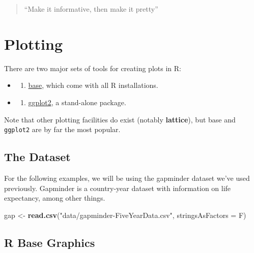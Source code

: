 \documentclass[]{book}
\newenvironment{Shaded}{\begin{snugshade}}{\end{snugshade}}
\newcommand{\KeywordTok}[1]{\textcolor[rgb]{0.13,0.29,0.53}{\textbf{#1}}}
\newcommand{\DataTypeTok}[1]{\textcolor[rgb]{0.13,0.29,0.53}{#1}}
\newcommand{\StringTok}[1]{\textcolor[rgb]{0.31,0.60,0.02}{#1}}
\newcommand{\NormalTok}[1]{#1}
\providecommand{\tightlist}{%
  \setlength{\itemsep}{0pt}\setlength{\parskip}{0pt}}
\begin{document}
\begin{quote}
``Make it informative, then make it pretty''
\end{quote}

\chapter{Plotting}\label{plotting}

There are two major sets of tools for creating plots in R:

\begin{itemize}
\item
  \begin{enumerate}
  \def\labelenumi{\arabic{enumi}.}
  \tightlist
  \item
    \protect\hyperlink{1-r-base-graphics}{base}, which come with all R
    installations.
  \end{enumerate}
\item
  \begin{enumerate}
  \def\labelenumi{\arabic{enumi}.}
  \setcounter{enumi}{1}
  \tightlist
  \item
    \protect\hyperlink{2-ggplot2}{ggplot2}, a stand-alone package.
  \end{enumerate}
\end{itemize}

Note that other plotting facilities do exist (notably \textbf{lattice}),
but base and \texttt{ggplot2} are by far the most popular.

\section{The Dataset}\label{the-dataset}

For the following examples, we will be using the gapminder dataset we've
used previously. Gapminder is a country-year dataset with information on
life expectancy, among other things.

\begin{Shaded}
\begin{Highlighting}[]
\NormalTok{gap <-}\StringTok{ }\KeywordTok{read.csv}\NormalTok{(}\StringTok{"data/gapminder-FiveYearData.csv"}\NormalTok{, }\DataTypeTok{stringsAsFactors =}\NormalTok{ F)}
\end{Highlighting}
\end{Shaded}

\section{R Base Graphics}\label{r-base-graphics}
\end{document}
